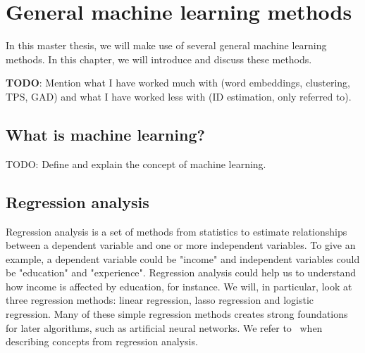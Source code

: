 \chapter{General machine learning methods}
In this master thesis, we will make use of several general machine learning methods. In this chapter, we will introduce and discuss these methods.

\textbf{TODO}:
Mention what I have worked much with (word embeddings, clustering, TPS, GAD) and what I have worked less with (ID estimation, only referred to).

\section{What is machine learning?}
TODO: Define and explain the concept of machine learning.

\section{Regression analysis}
Regression analysis is a set of methods from statistics to estimate relationships between a dependent variable and one or more independent variables. To give an example, a dependent variable could be "income" and independent variables could be "education" and "experience". Regression analysis could help us to understand how income is affected by education, for instance. We will, in particular, look at three regression methods: linear regression, lasso regression and logistic regression. Many of these simple regression methods creates strong foundations for later algorithms, such as artificial neural networks. We refer to \cites{James2013}{fox2015applied} \, when describing concepts from regression analysis.

